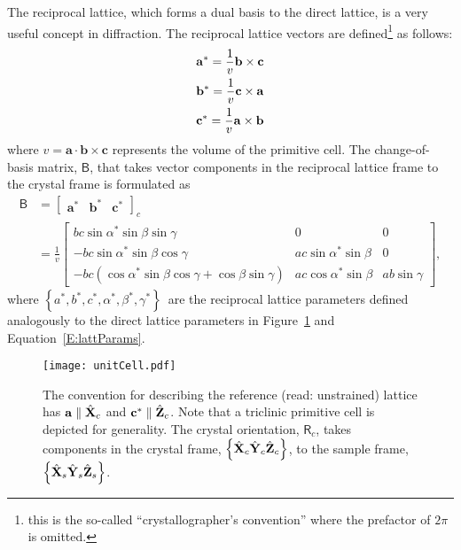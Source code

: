 \documentclass[12pt,letterpaper,final]{amsart}
\newcommand{\mbm}[1]{\ensuremath{\mbox{\boldmath$#1$}}}
\newcommand{\rmatc}{\ensuremath{\mathsf{R}_c}}
\newcommand{\bmat}{\ensuremath{\mathsf{B}}}
\newcommand{\Xs}{\ensuremath{\hat{\mbm{\mathrm{X}}}_s}}
\newcommand{\Ys}{\ensuremath{\hat{\mbm{\mathrm{Y}}}_s}}
\newcommand{\Zs}{\ensuremath{\hat{\mbm{\mathrm{Z}}}_s}}
\newcommand{\samframe}{\ensuremath{\left\{\Xs\Ys\Zs\right\}}}
\newcommand{\Xc}{\ensuremath{\hat{\mbm{\mathrm{X}}}_c}}
\newcommand{\Yc}{\ensuremath{\hat{\mbm{\mathrm{Y}}}_c}}
\newcommand{\Zc}{\ensuremath{\hat{\mbm{\mathrm{Z}}}_c}}
\newcommand{\xtlframe}{\ensuremath{\left\{\Xc\Yc\Zc\right\}}}
\newcommand{\xtlcomps}[1]{\left[#1\right]_c}
\newcommand{\figref}[1]{Figure~\ref{#1}}
\newcommand{\eqnref}[1]{Equation~\ref{#1}}
\newcommand{\cella}{\ensuremath{\mathbf{a}}}
\newcommand{\cellb}{\ensuremath{\mathbf{b}}}
\newcommand{\cellc}{\ensuremath{\mathbf{c}}}
\newcommand{\dbeta}{\ensuremath{\beta}}
\newcommand{\dgama}{\ensuremath{\gamma}}
\newcommand{\rcella}{\ensuremath{\mathbf{a}^*}}
\newcommand{\rcellb}{\ensuremath{\mathbf{b}^*}}
\newcommand{\rcellc}{\ensuremath{\mathbf{c}^*}}
\newcommand{\ralfa}{\ensuremath{\alpha^*}}
\newcommand{\rbeta}{\ensuremath{\beta^*}}
\newcommand{\rgama}{\ensuremath{\gamma^*}}
\newcommand{\rcellParams}{\ensuremath{\left\{ a^*,b^*,c^*,\ralfa,\rbeta,\rgama \right\}}}
\newcommand{\cellVol}{\ensuremath{v}}
\newcommand{\cellVolExpr}{\ensuremath{\dotp{\cella}{\crossp{\cellb}{\cellc}}}}
\newcommand{\dotp}[2]{\ensuremath{#1\cdot#2}}
\newcommand{\crossp}[2]{\ensuremath{#1\times#2}}
\begin{document}
The reciprocal lattice, which forms a dual basis to the direct
lattice, is a very useful concept in diffraction.  The reciprocal lattice vectors are
defined\footnote{this is the so-called ``crystallographer's
convention'' where the prefactor of $2\pi$ is omitted.} as follows:
\begin{align}
  \rcella = {1 \over v}\crossp{\cellb}{\cellc}\\
  \rcellb = {1 \over v}\crossp{\cellc}{\cella}\\
  \rcellc = {1 \over v}\crossp{\cella}{\cellb}
\end{align}
where $\cellVol = \cellVolExpr$ represents the volume of the primitive
cell.  The change-of-basis matrix, \bmat, that takes vector components in the
reciprocal lattice frame to the crystal frame is formulated as
\begin{align}
  \bmat &= \xtlcomps{\begin{matrix} \rcella & \rcellb & \rcellc \end{matrix}} \label{E:bmatrix}\\ 
        &= \frac{1}{\cellVol}\begin{bmatrix}
           bc\sin{\ralfa}\sin{\dbeta}\sin{\dgama} &                          0 &                                           0 \\
          -bc\sin{\ralfa}\sin{\dbeta}\cos{\dgama} & ac\sin{\ralfa}\sin{\dbeta} &                                           0 \\
          -bc(\cos{\ralfa}\sin{\dbeta}\cos{\dgama} + \cos{\dbeta}\sin{\dgama}) & ac\cos{\ralfa}\sin{\dbeta} & ab\sin{\dgama}
	\end{bmatrix}, \nonumber
\end{align}
where \rcellParams\ are the reciprocal lattice parameters defined
analogously to the direct lattice parameters in \figref{F:lattice} and
\eqnref{E:lattParams}.
\begin{figure}
  \centering
  \texttt{[image: unitCell.pdf]}
  \caption{The convention for describing the
    reference (read: unstrained) lattice has $\cella\parallel\Xc$ and
    $\rcellc\parallel\Zc$. Note that a triclinic
    primitive cell is depicted for generality.  The crystal orientation, \rmatc,
    takes components in the crystal frame, \xtlframe, to the sample
    frame, \samframe.}
  \label{F:lattice}
\end{figure}
\end{document}
